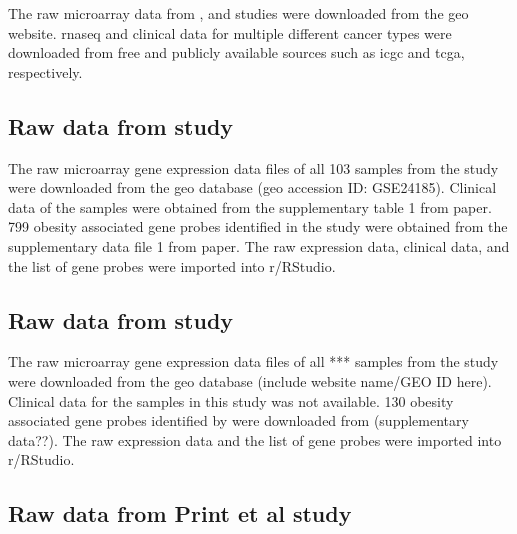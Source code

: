 The raw microarray data from \citet{Creighton2012}, \citet{Fuentes-Mattei2014} and \citet{Gatza2010a}  studies were downloaded from the \gls{geo} website.
\gls{rnaseq} and clinical data for multiple different cancer types were downloaded from free and publicly available sources such as \gls{icgc} and \gls{tcga}, respectively.

\subsection{Raw data from \citet{Creighton2012} study}
\label{subsec:crrawdat}


The raw microarray gene expression data files of all 103 samples from the \citet{Creighton2012} study were downloaded from the \gls{geo} database (\gls{geo} accession ID: GSE24185).
Clinical data of the samples were obtained from the supplementary table 1 from \citet{Creighton2012} paper.
799 obesity associated gene probes identified in the \citet{Creighton2012} study were obtained from the supplementary data file 1 from \citet{Creighton2012} paper.
The raw expression data, clinical data, and the list of gene probes were imported into \gls{r}/RStudio.

\subsection{Raw data from \citet{Fuentes-Mattei2014} study}
\label{subsec:fmrawdat}


The raw microarray gene expression data files of all *** samples from the  \citet{Fuentes-Mattei2014} study were downloaded from the \gls{geo} database (include website name/GEO ID here).
Clinical data for the samples in this study was not available.
130 obesity associated gene probes identified by \citet{Fuentes-Mattei2014} were downloaded from (supplementary data??).
The raw expression data and the list of gene probes were imported into \gls{r}/RStudio.

\subsection{Raw data from Print et al study}
\label{subsec:printrawdat}

